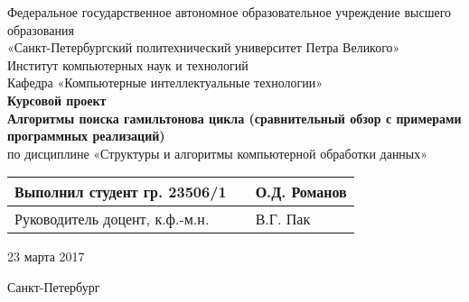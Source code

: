 \begin{titlepage}	%

	\begin{center}		%

		\large Федеральное государственное автономное образовательное учреждение высшего образования \\
		\large «Санкт-Петербургский политехнический университет Петра Великого» \\
		\large Институт компьютерных наук и технологий \\
		\large Кафедра «Компьютерные интеллектуальные технологии» \\[4cm] %

		\huge {\bf Курсовой проект} \\[0.5cm] %
		\large {\bf Алгоритмы поиска гамильтонова цикла (сравнительный обзор с примерами программных реализаций)} \\[0.1cm]
		\large по дисциплине «Структуры и алгоритмы компьютерной обработки данных» \\[4cm]

	\end{center}

    \begin{tabular}{|p{4cm}|p{2cm}|p{4cm}|} \hline
        Выполнил студент гр. 23506/1 & & О.Д. Романов \\ \hline
        Руководитель доцент, к.ф.-м.н. & &  В.Г. Пак \\ \hline
    \end{tabular}

    \begin{flushright}
        23 марта 2017
    \end{flushright}

	
	\vfill %

	\begin{center}
	\large Санкт-Петербург\\
	\large \the\year %
	\end{center} %

\thispagestyle{empty} %
\end{titlepage} %

\vfill %